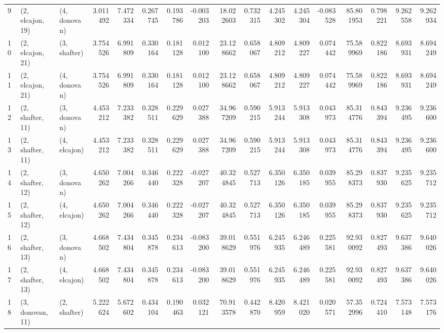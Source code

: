 \begin{tabular}{lllrrrrrrrrrrrrrr}
9  &  (2, elcajon, 19) &     (4, donovan) &  3.011492 &  7.472334 &   0.267745 &  0.193786 & -0.003203 &   18.022603 &  0.732315 &   4.245302 &   4.245304 & -0.083528 &   85.801953 &  0.798221 &   9.262558 &   9.262934 \\
10 &  (2, elcajon, 21) &     (3, shafter) &  3.754526 &  6.991809 &   0.330164 &  0.181128 &  0.012100 &   23.128662 &  0.658067 &   4.809212 &   4.809227 &  0.074442 &   75.589969 &  0.822186 &   8.693931 &   8.694249 \\
11 &  (2, elcajon, 21) &     (4, donovan) &  3.754526 &  6.991809 &   0.330164 &  0.181128 &  0.012100 &   23.128662 &  0.658067 &   4.809212 &   4.809227 &  0.074442 &   75.589969 &  0.822186 &   8.693931 &   8.694249 \\
12 &  (2, shafter, 11) &     (3, donovan) &  4.453212 &  7.233382 &   0.328511 &  0.229629 &  0.027388 &   34.967209 &  0.590215 &   5.913244 &   5.913308 &  0.043973 &   85.314776 &  0.843394 &   9.236495 &   9.236600 \\
13 &  (2, shafter, 11) &     (4, elcajon) &  4.453212 &  7.233382 &   0.328511 &  0.229629 &  0.027388 &   34.967209 &  0.590215 &   5.913244 &   5.913308 &  0.043973 &   85.314776 &  0.843394 &   9.236495 &   9.236600 \\
14 &  (2, shafter, 12) &     (3, donovan) &  4.650262 &  7.004266 &   0.346440 &  0.222328 & -0.027207 &   40.324845 &  0.527713 &   6.350126 &   6.350185 &  0.039955 &   85.298373 &  0.837930 &   9.235625 &   9.235712 \\
15 &  (2, shafter, 12) &     (4, elcajon) &  4.650262 &  7.004266 &   0.346440 &  0.222328 & -0.027207 &   40.324845 &  0.527713 &   6.350126 &   6.350185 &  0.039955 &   85.298373 &  0.837930 &   9.235625 &   9.235712 \\
16 &  (2, shafter, 13) &     (3, donovan) &  4.668502 &  7.434804 &   0.345878 &  0.234613 & -0.083200 &   39.018629 &  0.551976 &   6.245935 &   6.246489 &  0.225581 &   92.930092 &  0.827493 &   9.637386 &   9.640026 \\
17 &  (2, shafter, 13) &     (4, elcajon) &  4.668502 &  7.434804 &   0.345878 &  0.234613 & -0.083200 &   39.018629 &  0.551976 &   6.245935 &   6.246489 &  0.225581 &   92.930092 &  0.827493 &   9.637386 &   9.640026 \\
18 &  (3, donovan, 11) &     (2, shafter) &  5.222624 &  5.672602 &   0.434104 &  0.190463 &  0.032121 &   70.913578 &  0.442870 &   8.420959 &   8.421020 &  0.020571 &   57.352996 &  0.724410 &   7.573148 &   7.573176 \\

\end{tabular}
